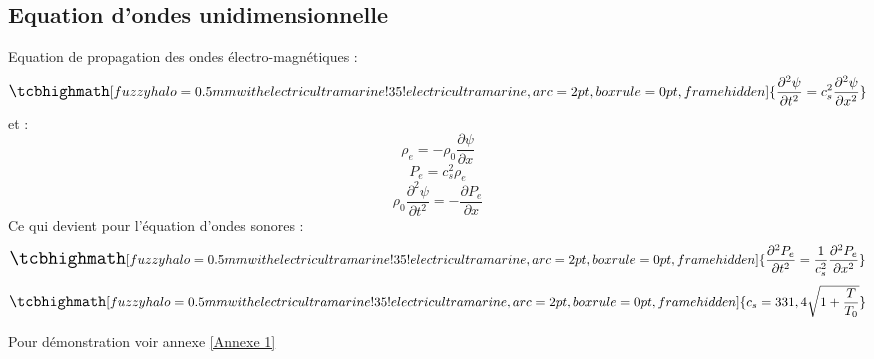 \subsection{Equation d'ondes unidimensionnelle}
Equation de propagation des ondes électro-magnétiques :
\begin{equation}
    \large
    \tcbhighmath[fuzzy halo=0.5mm with electricultramarine!35!electricultramarine,arc=2pt,
    boxrule=0pt,frame hidden]{ 
        \frac{\partial^{2} \psi}{\partial t^{2}} = c_{s}^{2}\frac{\partial^{2} \psi}{\partial x^{2}}
     } \nonumber
    \normalsize
\end{equation}
et : 
\begin{equation}
    \label{eq 1}
    \rho_{e} = -\rho_{0}\frac{\partial \psi }{\partial x}  
\end{equation}
\begin{equation}
    \label{eq 2}
    P_{e} = c_{s}^{2}\rho_{e}
\end{equation}
\begin{equation}
    \label{eq 3}
    \rho_{0} \frac{\partial^{2} \psi}{\partial t^{2}} = -\frac{\partial P_{e}}{\partial x}
\end{equation}
Ce qui devient pour l'équation d'ondes sonores :
\begin{equation}
    \Large
    \tcbhighmath[fuzzy halo=0.5mm with electricultramarine!35!electricultramarine,arc=2pt,
    boxrule=0pt,frame hidden]{ 
        \frac{\partial^{2} P_{e}}{\partial t^{2}} = \frac{1}{c_{s}^{2}}\frac{\partial^{2} P_{e}}{\partial x^{2}}
     } \nonumber
    \normalsize
\end{equation}
\vfil
\begin{equation}
    \large
    \tcbhighmath[fuzzy halo=0.5mm with electricultramarine!35!electricultramarine,arc=2pt,
    boxrule=0pt,frame hidden]{ 
        c_{s} = 331,4\sqrt{1+\frac{T}{T_{0}}}
     } \nonumber
    \normalsize
\end{equation}
\vfill
\begin{center}
    \small{Pour démonstration voir annexe \ref{Annexe 1}}
\end{center}
\newpage

